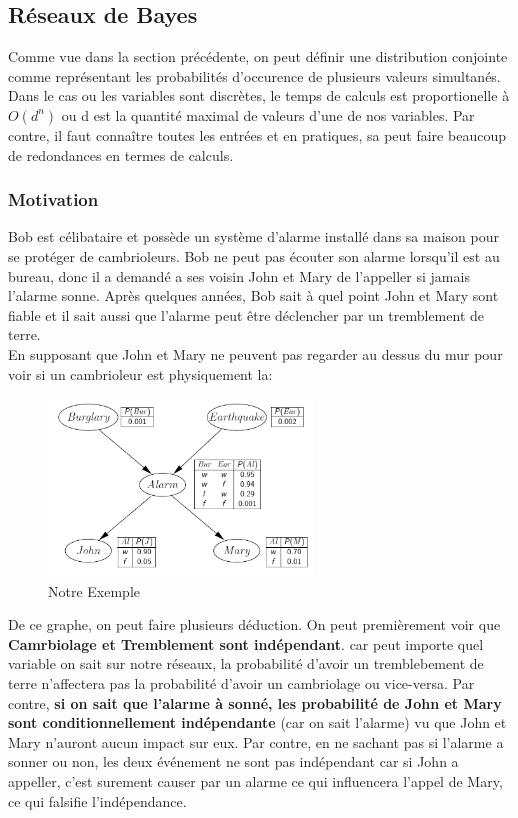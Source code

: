 \documentclass[oneside]{book}
\begin{document}
\subsection{Réseaux de Bayes}
Comme vue dans la section précédente, on peut définir une distribution conjointe comme représentant les probabilités d'occurence de plusieurs valeurs simultanés. Dans le cas ou les variables sont discrètes, le temps de calculs est proportionelle à $O(d^n)$ ou d est la quantité maximal de valeurs d'une de nos variables. Par contre, il faut connaître toutes les entrées et en pratiques, sa peut faire beaucoup de redondances en termes de calculs.\\

\subsubsection{Motivation}
Bob est célibataire et possède un système d'alarme installé dans sa maison pour se protéger de cambrioleurs. Bob ne peut pas écouter son alarme lorsqu'il est au bureau, donc il a demandé a ses voisin John et Mary de l'appeller si jamais l'alarme sonne. Après quelques années, Bob sait à quel point John et Mary sont fiable et il sait aussi que l'alarme peut être déclencher par un tremblement de terre. \\

En supposant que John et Mary ne peuvent pas regarder au dessus du mur pour voir si un cambrioleur est physiquement la:\\

\begin{figure}[!ht]
\centering
\includegraphics[width = 7cm]{bayes_network.png}
\caption{Notre Exemple}
\label{fig:bayes_network_exemple}
\end{figure}

De ce graphe, on peut faire plusieurs déduction. On peut premièrement voir que \textbf{Camrbiolage et Tremblement sont indépendant}. car peut importe quel variable on sait sur notre réseaux, la probabilité d'avoir un tremblebement de terre n'affectera pas la probabilité d'avoir un cambriolage ou vice-versa. Par contre, \textbf{si on sait que l'alarme à sonné, les probabilité de John et Mary sont conditionnellement indépendante} (car on sait l'alarme) vu que John et Mary n'auront aucun impact sur eux. Par contre, en ne sachant pas si l'alarme a sonner ou non, les deux événement ne sont pas indépendant car si John a appeller, c'est surement causer par un alarme ce qui influencera l'appel de Mary, ce qui falsifie l'indépendance.\\
\end{document}
